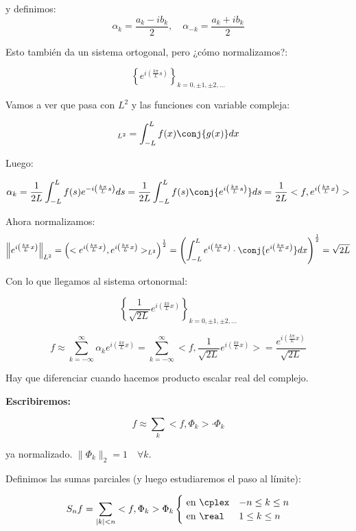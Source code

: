 		y definimos:
		\[
			\alpha_k = \frac{a_k - ib_k}{2}, \quad \alpha_{-k} = \frac{a_k + ib_k}{2}
		\]

		Esto también da un sistema ortogonal, pero ¿cómo normalizamos?:

		\[\left\{ e^{i \left( \frac{k \pi}{L} s \right)} \right\}_{k = 0,±1,±2,…} \]

		Vamos a ver que pasa con $L^2$ y las funciones con variable compleja:

		\[<f,g>_{L^2} = \int^L_{-L} f(x) \conj{g(x)} dx \]

		Luego:

		\[ \alpha_k = \frac{1}{2L} \int^L_{-L} f(s) e^{-i \left( \frac{k \pi}{L} s \right)} ds = \frac{1}{2L} \int_{-L}^L f(s) \conj{e^{i \left( \frac{k \pi}{L} s \right)}} ds = \frac{1}{2L} <f, e^{i \left( \frac{k \pi}{L} x \right)}> \]

		Ahora normalizamos:
		\[
		\left\|e^{i \left( \frac{k \pi}{L} x \right)}\right\|_{L^2} = \left( < e^{i \left( \frac{k \pi}{L} x \right)}, e^{i \left( \frac{k \pi}{L} x \right)} >_{L^2} \right)^{\frac{1}{2}} = \left( \int^{L}_{-L} e^{i \left( \frac{k \pi}{L} x \right)} \cdot \conj{ e^{i \left( \frac{k \pi}{L} x \right)}} dx \right)^{\frac{1}{2}} = \sqrt{2L}
		\]

		Con lo que llegamos al sistema ortonormal:

		\[
			\left\{ \frac{1}{\sqrt{2L}} e^{i \left( \frac{k \pi}{L} x \right)} \right\}_{k = 0, ±1, ±2, …}
		\]

		\[
		f ≈ \sum_{k=-\infty}^\infty \alpha_k e^{i \left( \frac{k \pi}{L} x \right)} = \sum_{k = -\infty}^\infty < f, \frac{1}{\sqrt{2L}} e^{i \left( \frac{k \pi}{L} x \right)} > = \frac{e^{i \left( \frac{k \pi}{L} x \right)}}{\sqrt{2L}}
		\]

		\obs Hay que diferenciar cuando hacemos producto escalar real del complejo.

		\textbf{Escribiremos:}

		\[ f ≈ \sum_k <f, \Phi_k> \cdot \Phi_k \]

		ya normalizado. $\|\Phi_k\|_2 = 1 \quad \forall k$.

		Definimos las sumas parciales (y luego estudiaremos el paso al límite):

		\[
		S_n f = \sum_{|k| < n} <f, \Phi_k> \Phi_k \begin{cases}
			\text{ en } \cplex & -n \leq k \leq n \\
			\text{ en } \real & 1 \leq k \leq n
		\end{cases}
		\]

